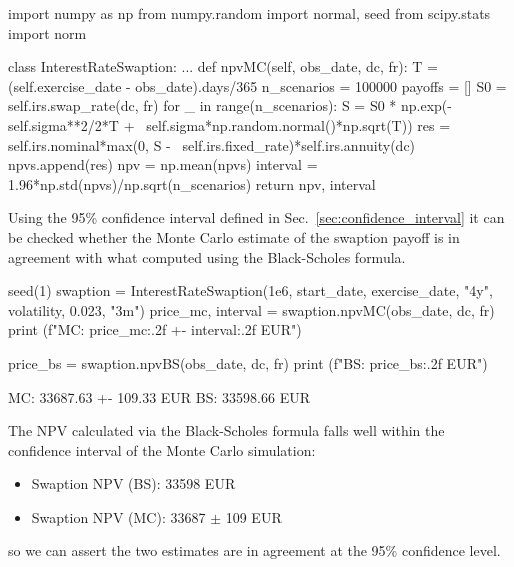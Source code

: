 \begin{ipython}
import numpy as np
from numpy.random import normal, seed
from scipy.stats import norm 

class InterestRateSwaption:
    ...
    def npvMC(self, obs_date, dc, fr):
        T = (self.exercise_date - obs_date).days/365
        n_scenarios = 100000
        payoffs = []
        S0 = self.irs.swap_rate(dc, fr)
        for _ in range(n_scenarios):
            S = S0 * np.exp(-self.sigma**2/2*T + \
                            self.sigma*np.random.normal()*np.sqrt(T))
            res = self.irs.nominal*max(0, S - \
                                          self.irs.fixed_rate)*self.irs.annuity(dc)
            npvs.append(res)
        npv = np.mean(npvs)
        interval = 1.96*np.std(npvs)/np.sqrt(n_scenarios)
        return npv, interval
\end{ipython}

Using the 95\% confidence interval defined in Sec.~\ref{sec:confidence_interval} it can be checked whether the Monte Carlo estimate of the swaption payoff is in agreement with what computed using the Black-Scholes formula.

\begin{ipython}
seed(1)
swaption = InterestRateSwaption(1e6, start_date, exercise_date, "4y",
                                volatility, 0.023, "3m")
price_mc, interval = swaption.npvMC(obs_date, dc, fr)
print (f"MC: {price_mc:.2f} +- {interval:.2f} EUR")

price_bs = swaption.npvBS(obs_date, dc, fr)
print (f"BS: {price_bs:.2f} EUR")
\end{ipython}
\begin{ioutput}
MC: 33687.63 +- 109.33 EUR
BS: 33598.66 EUR
\end{ioutput}

The NPV calculated via the Black-Scholes formula falls well within the confidence interval of the Monte Carlo simulation:

\begin{itemize}
\tightlist
\item Swaption NPV (BS): 33598 EUR
\item Swaption NPV (MC): 33687 $\pm$ 109 EUR
\end{itemize}
so we can assert the two estimates are in agreement at the 95\% confidence level.

%

